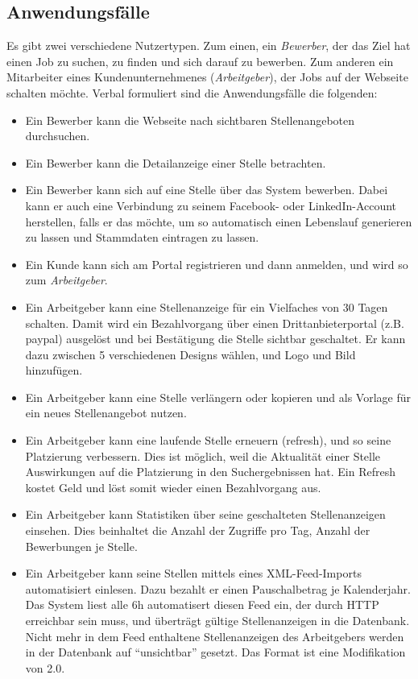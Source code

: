 \subsection{Anwendungsfälle}
Es gibt zwei verschiedene Nutzertypen. Zum einen, ein \textit{Bewerber}, der das Ziel hat einen Job zu suchen, zu finden und sich darauf zu bewerben. Zum anderen ein Mitarbeiter eines Kundenunternehmenes (\textit{Arbeitgeber}), der Jobs auf der Webseite schalten möchte.
Verbal formuliert sind die Anwendungsfälle die folgenden:
\begin{itemize}
 \item Ein Bewerber kann die Webseite nach sichtbaren Stellenangeboten durchsuchen.
 \item Ein Bewerber kann die Detailanzeige einer Stelle betrachten.
 \item Ein Bewerber kann sich auf eine Stelle über das System bewerben. Dabei kann er auch eine Verbindung zu seinem Facebook- oder LinkedIn-Account herstellen, falls er das möchte, um so automatisch einen Lebenslauf generieren zu lassen und Stammdaten eintragen zu lassen.
 \item Ein Kunde kann sich am Portal registrieren und dann anmelden, und wird so zum \textit{Arbeitgeber}.
 \item Ein Arbeitgeber kann eine Stellenanzeige für ein Vielfaches von 30 Tagen schalten. Damit wird ein Bezahlvorgang über einen Drittanbieterportal (z.B. paypal) ausgelöst und bei Bestätigung die Stelle sichtbar geschaltet. Er kann dazu zwischen 5 verschiedenen Designs wählen, und Logo und Bild hinzufügen.
 \item Ein Arbeitgeber kann eine Stelle verlängern oder kopieren und als Vorlage für ein neues Stellenangebot nutzen.
 \item Ein Arbeitgeber kann eine laufende Stelle erneuern (refresh), und so seine Platzierung verbessern. Dies ist möglich, weil die Aktualität einer Stelle Auswirkungen auf die Platzierung in den Suchergebnissen hat. Ein Refresh kostet Geld und löst somit wieder einen Bezahlvorgang aus.
 \item Ein Arbeitgeber kann Statistiken über seine geschalteten Stellenanzeigen einsehen. Dies beinhaltet die Anzahl der Zugriffe pro Tag, Anzahl der Bewerbungen je Stelle.
 \item Ein Arbeitgeber kann seine Stellen mittels eines XML-Feed-Imports automatisiert einlesen. Dazu bezahlt er einen Pauschalbetrag je Kalenderjahr. Das System liest alle 6h automatisert diesen Feed ein, der durch HTTP erreichbar sein muss, und überträgt gültige Stellenanzeigen in die Datenbank. Nicht mehr in dem Feed enthaltene Stellenanzeigen des Arbeitgebers werden in der Datenbank auf "`unsichtbar"' gesetzt. Das Format ist eine Modifikation von  2.0.
\end{itemize}



